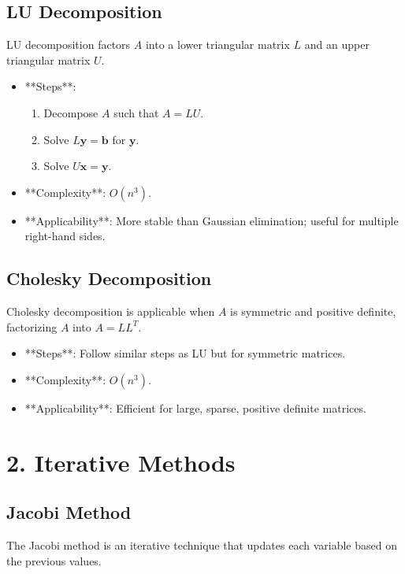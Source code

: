 \documentclass{article}
\begin{document}
\subsection{LU Decomposition}
LU decomposition factors \( A \) into a lower triangular matrix \( L \) and an upper triangular matrix \( U \).

\begin{itemize}
    \item **Steps**: 
    \begin{enumerate}
        \item Decompose \( A \) such that \( A = LU \).
        \item Solve \( L\mathbf{y} = \mathbf{b} \) for \( \mathbf{y} \).
        \item Solve \( U\mathbf{x} = \mathbf{y} \).
    \end{enumerate}
    \item **Complexity**: \( O(n^3) \).
    \item **Applicability**: More stable than Gaussian elimination; useful for multiple right-hand sides.
\end{itemize}

\subsection{Cholesky Decomposition}
Cholesky decomposition is applicable when \( A \) is symmetric and positive definite, factorizing \( A \) into \( A = LL^T \).

\begin{itemize}
    \item **Steps**: Follow similar steps as LU but for symmetric matrices.
    \item **Complexity**: \( O(n^3) \).
    \item **Applicability**: Efficient for large, sparse, positive definite matrices.
\end{itemize}

\section{2. Iterative Methods}

\subsection{Jacobi Method}
The Jacobi method is an iterative technique that updates each variable based on the previous values.
\end{document}
